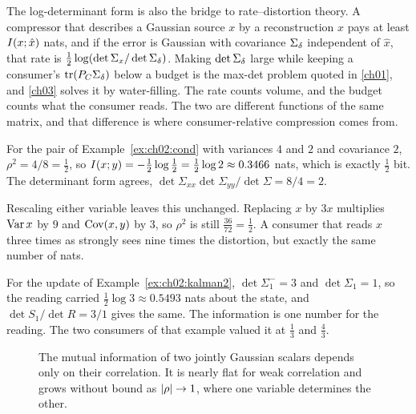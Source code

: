 The log-determinant form is also the bridge to rate--distortion theory. A
compressor that describes a Gaussian source $x$ by a reconstruction $\hat x$
pays at least $I(x;\hat x)$ nats, and if the error is Gaussian with
covariance $\Sigma_\delta$ independent of $\hat x$, that rate is
$\tfrac12\log(\det\Sigma_x/\det\Sigma_\delta)$. Making $\det\Sigma_\delta$ large while keeping a
consumer's $\operatorname{tr}(P_C\Sigma_\delta)$ below a budget is the max-det problem quoted in
\cref{ch01}, and \cref{ch03} solves it by water-filling. The rate counts
volume, and the budget counts what the consumer reads. The two are different
functions of the same matrix, and that difference is where consumer-relative
compression comes from.

\begin{example}\label{ex:ch02:mi}
For the pair of Example~\ref{ex:ch02:cond} with variances $4$ and $2$ and covariance
$2$, $\rho^2=4/8=\tfrac12$, so $I(x;y)=-\tfrac12\log\tfrac12=\tfrac12\log2\approx0.3466$
nats, which is exactly $\tfrac12$ bit. The determinant form agrees,
$\det\Sigma_{xx}\det\Sigma_{yy}/\det\Sigma=8/4=2$.

Rescaling either variable leaves this unchanged. Replacing $x$ by $3x$ multiplies
$\operatorname{Var} x$ by $9$ and $\operatorname{Cov}(x,y)$ by $3$, so $\rho^2$ is still $\tfrac{36}{72}=\tfrac12$.
A consumer that reads $x$ three times as strongly sees nine times the
distortion, but exactly the same number of nats.

For the update of Example~\ref{ex:ch02:kalman2}, $\det\Sigma_1^-=3$ and $\det\Sigma_1=1$,
so the reading carried $\tfrac12\log3\approx0.5493$ nats about the state, and
$\det S_1/\det R=3/1$ gives the same. The information is one number for the
reading. The two consumers of that example valued it at $\tfrac13$ and
$\tfrac43$.
\end{example}

\begin{figure}[tbp]
\centering
{}
\caption{The mutual information of two jointly Gaussian scalars depends only on
their correlation. It is nearly flat for weak correlation and grows without
bound as $\lvert \rho\rvert\to1$, where one variable determines the other.}
\label{fig:ch02:mi}
\end{figure}

